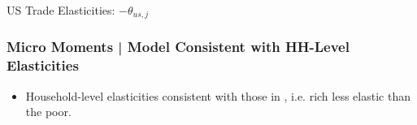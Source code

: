 \documentclass[9pt,pdftex,aspectratio=1610]{beamer}
\theoremstyle{definition}
\begin{document}
\begin{frame}[t]{US Trade Elasticities: $-\theta_{us,j}$}
\begin{figure}[!t]
\hspace{-.5cm}
\end{figure}
\end{frame}

\begin{frame}[t]
\frametitle{Micro Moments | Model Consistent with HH-Level Elasticities}
\begin{figure}[!t]
\end{figure}
\begin{itemize}
\smallskip
\item Household-level elasticities consistent with those in \citet*{auer2022unequal}, i.e. rich less elastic than the poor.
\end{itemize}
\end{frame}
\end{document}
